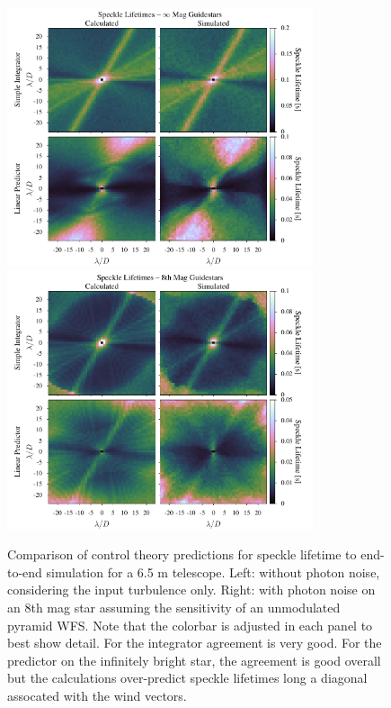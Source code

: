 \documentclass[11pt,preprint]{aastex}
\begin{document}
\begin{figure}
\hspace{-0.3in}
\includegraphics[width=3.54in]{lifetimes0mag.pdf}
\includegraphics[width=3.54in]{lifetimes8mag.pdf}
\caption{Comparison of control theory predictions for speckle lifetime to end-to-end simulation for a 6.5 m telescope.  Left: without photon noise, considering the input turbulence only.  Right: with photon noise on an 8th mag star assuming the sensitivity of an unmodulated pyramid WFS. Note that the colorbar is adjusted in each panel to best show detail. For the integrator agreement is very good.  For the predictor on the infinitely bright star, the agreement is good overall but the calculations over-predict speckle lifetimes long a diagonal assocated with the wind vectors.  \label{fig:lifetime_2Dcomp}}
\end{figure}
\end{document}
